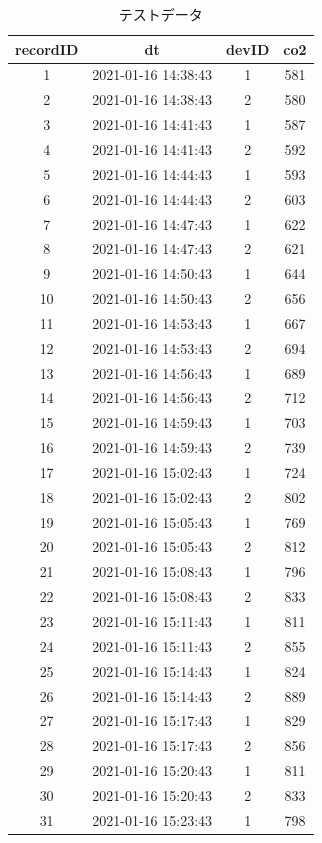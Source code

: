 \begin{longtable}{|c|c|c|c|}
	\caption{テストデータ}
	\label{testdata}
	\endhead
	\hline
	recordID & dt & devID & co2\\ \hline \hline
	1 & 2021-01-16 14:38:43 & 1 & 581\\
	2 & 2021-01-16 14:38:43 & 2 & 580\\
	3 & 2021-01-16 14:41:43 & 1 & 587\\
	4 & 2021-01-16 14:41:43 & 2 & 592\\
	5 & 2021-01-16 14:44:43 & 1 & 593\\
	6 & 2021-01-16 14:44:43 & 2 & 603\\ 
	7 & 2021-01-16 14:47:43 & 1 & 622\\ 
	8 & 2021-01-16 14:47:43 & 2 & 621\\ 
	9 & 2021-01-16 14:50:43 & 1 & 644\\ 
	10 & 2021-01-16 14:50:43 & 2 & 656\\ 
	11 & 2021-01-16 14:53:43 & 1 & 667\\ 
	12 & 2021-01-16 14:53:43 & 2 & 694\\
	13 & 2021-01-16 14:56:43 & 1 & 689\\
	14 & 2021-01-16 14:56:43 & 2 & 712\\ 
	15 & 2021-01-16 14:59:43 & 1 & 703\\
	16 & 2021-01-16 14:59:43 & 2 & 739\\
	17 & 2021-01-16 15:02:43 & 1 & 724\\
	18 & 2021-01-16 15:02:43 & 2 & 802\\
	19 & 2021-01-16 15:05:43 & 1 & 769\\
	20 & 2021-01-16 15:05:43 & 2 & 812\\
	21 & 2021-01-16 15:08:43 & 1 & 796\\
	22 & 2021-01-16 15:08:43 & 2 & 833\\
	23 & 2021-01-16 15:11:43 & 1 & 811\\
	24 & 2021-01-16 15:11:43 & 2 & 855\\
	25 & 2021-01-16 15:14:43 & 1 & 824\\
	26 & 2021-01-16 15:14:43 & 2 & 889\\
	27 & 2021-01-16 15:17:43 & 1 & 829\\
	28 & 2021-01-16 15:17:43 & 2 & 856\\
	29 & 2021-01-16 15:20:43 & 1 & 811\\
	30 & 2021-01-16 15:20:43 & 2 & 833\\ 
	31 & 2021-01-16 15:23:43 & 1 & 798\\

\end{longtable}
